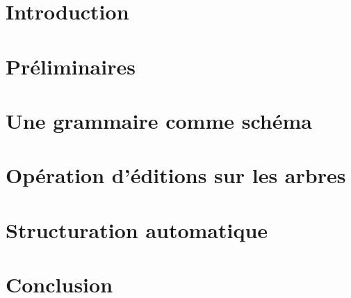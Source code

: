 \section{Introduction}


\section{Préliminaires}


\section{Une grammaire comme schéma}


\section{Opération d'éditions sur les arbres}


\section{Structuration automatique}


\section{Conclusion}


